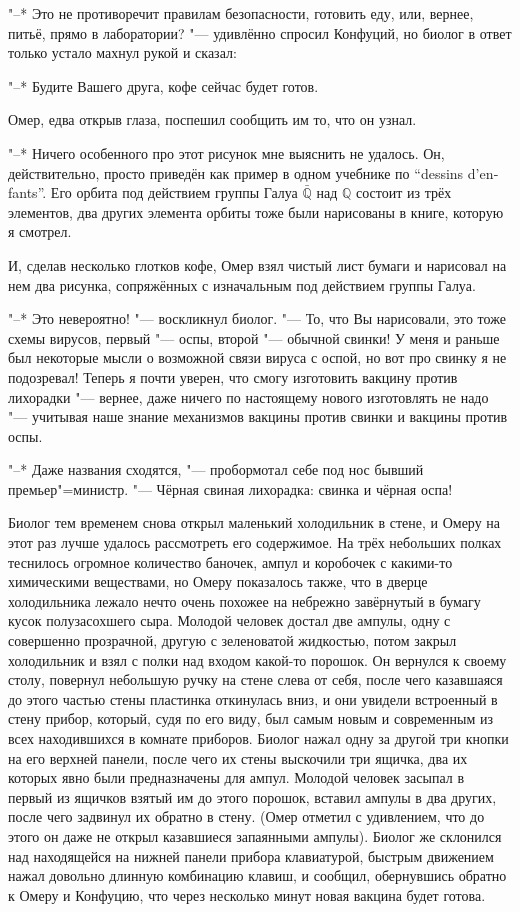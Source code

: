 "--* Это не противоречит правилам безопасности, готовить еду, или, вернее, питьё,
прямо в лаборатории? "--- удивлённо спросил Конфуций, но биолог в ответ только
устало махнул рукой и сказал:

"--* Будите Вашего друга, кофе сейчас будет готов.

Омер, едва открыв глаза, поспешил сообщить им то, что он узнал.

"--* Ничего особенного про этот рисунок мне выяснить не удалось.
Он, действительно, просто приведён как пример в одном учебнике по
\enquote{\foreignlanguage{french}{dessins d'enfants}}.
Его орбита под действием группы Галуа $\bar{\mathbb{Q}}$ над $\mathbb{Q}$
состоит из трёх элементов, два других элемента орбиты тоже были нарисованы в
книге, которую я смотрел.

И, сделав несколько глотков кофе, Омер взял чистый лист бумаги и нарисовал на
нем два рисунка, сопряжённых с изначальным под действием группы Галуа.

"--* Это невероятно! "--- воскликнул биолог.
"--- То, что Вы нарисовали, это тоже схемы вирусов, первый "--- оспы, второй
"--- обычной свинки!
У меня и раньше был некоторые мысли о возможной связи вируса с оспой, но вот
про свинку я не подозревал!
Теперь я почти уверен, что смогу изготовить вакцину против лихорадки "--- вернее,
даже ничего по настоящему нового изготовлять не надо "--- учитывая наше знание
механизмов вакцины против свинки и вакцины против оспы.

"--* Даже названия сходятся, "--- пробормотал себе под нос бывший
премьер"=министр.
"--- Чёрная свиная лихорадка: свинка и чёрная оспа!

Биолог тем временем снова открыл маленький холодильник в стене, и Омеру на этот
раз лучше удалось рассмотреть его содержимое.
На трёх небольших полках теснилось огромное количество баночек, ампул и
коробочек с какими-то химическими веществами, но Омеру показалось также, что в
дверце холодильника лежало нечто очень похожее на небрежно завёрнутый в бумагу
кусок полузасохшего сыра.
Молодой человек достал две ампулы, одну с совершенно прозрачной, другую с
зеленоватой жидкостью, потом закрыл холодильник и взял с полки над входом
какой-то порошок.
Он вернулся к своему столу, повернул небольшую ручку на стене слева от себя,
после чего казавшаяся до этого частью стены пластинка откинулась вниз, и они
увидели встроенный в стену прибор, который, судя по его виду, был самым новым и
современным из всех находившихся в комнате приборов.
Биолог нажал одну за другой три кнопки на его верхней панели, после чего их
стены выскочили три ящичка, два их которых явно были предназначены для ампул.
Молодой человек засыпал в первый из ящичков взятый им до этого порошок,
вставил ампулы в два других, после чего задвинул их обратно в стену.
(Омер отметил с удивлением, что до этого он даже не открыл казавшиеся запаянными
ампулы).
Биолог же склонился над находящейся на нижней панели прибора клавиатурой,
быстрым движением нажал довольно длинную комбинацию клавиш, и сообщил,
обернувшись обратно к Омеру и Конфуцию, что через несколько минут новая вакцина
будет готова.

